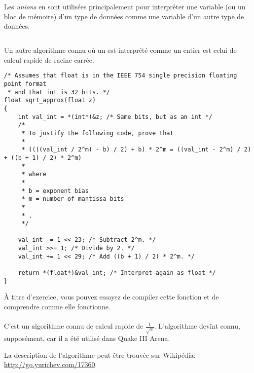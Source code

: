 
Les \emph{unions} en \CCpp sont utilisées principalement pour interpréter une variable
(ou un bloc de mémoire) d'un type de données comme une variable d'un autre type de données.





\subsection{\FRph{}}

Un autre algorithme connu où un \Tfloat est interprété comme un entier est celui
de calcul rapide de racine carrée.

\begin{lstlisting}[caption=Le code source provient de Wikipedia: \url{http://go.yurichev.com/17364},style=customc]
/* Assumes that float is in the IEEE 754 single precision floating point format
 * and that int is 32 bits. */
float sqrt_approx(float z)
{
    int val_int = *(int*)&z; /* Same bits, but as an int */
    /*
     * To justify the following code, prove that
     *
     * ((((val_int / 2^m) - b) / 2) + b) * 2^m = ((val_int - 2^m) / 2) + ((b + 1) / 2) * 2^m)
     *
     * where
     *
     * b = exponent bias
     * m = number of mantissa bits
     *
     * .
     */
 
    val_int -= 1 << 23; /* Subtract 2^m. */
    val_int >>= 1; /* Divide by 2. */
    val_int += 1 << 29; /* Add ((b + 1) / 2) * 2^m. */
 
    return *(float*)&val_int; /* Interpret again as float */
}
\end{lstlisting}

À titre d'exercice, vous pouvez essayez de compiler cette fonction et de comprendre
comme elle fonctionne.\\
\\
C'est un algorithme connu de calcul rapide de $\frac{1}{\sqrt{x}}$.
L'algorithme devînt connu, supposément, car il a été utilisé dans Quake III Arena.

La description de l'algorithme peut être trouvée sur Wikipédia: \url{http://go.yurichev.com/17360}.

